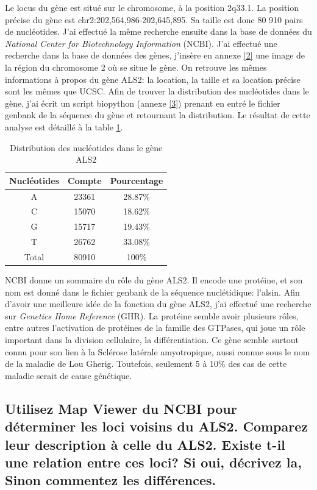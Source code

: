 \documentclass[11pt]{article} %
\begin{document}
Le locus du gène est situé sur le chromosome, à la position 2q33.1. La position précise du gène est chr2:202,564,986-202,645,895.
Sa taille est donc 80 910 pairs de nucléotides. J'ai effectué la même recherche ensuite dans la base de données du
\emph{National Center for Biotechnology Information} (NCBI). J'ai effectué une recherche dans la base de données des gènes,
j'insère en annexe \ref{2}  une image de la région du chromosome 2 où se situe le gène. On retrouve les mêmes informations
à propos du gène ALS2: la location, la taille et sa location précise sont les mêmes que UCSC. Afin de trouver la distribution
des nucléotides dans le gène, j'ai écrit un script biopython (annexe \ref{3}) prenant en entré le fichier genbank de la séquence
du gène et retournant la distribution. Le résultat de cette analyse est détaillé à la table \ref{tab:first}.
\begin{table}[b]
{\small
\centering
\begin{tabular}{|c|c|c|}

 \hline
 Nucléotides & Compte & Pourcentage \\
 \hline
 A & 23361 & 28.87\% \\
 \hline
  C & 15070 & 18.62\% \\
 \hline
  G & 15717 & 19.43\% \\
 \hline
  T & 26762 & 33.08\% \\
 \hline
  Total & 80910 & 100\% \\
 \hline
 \end{tabular}
\caption{{\small Distribution des nucléotides dans le gène ALS2}}
\label{tab:first}
}
\end{table}

NCBI donne un sommaire du rôle du gène ALS2. Il encode une protéine, et son nom est donné dans le fichier genbank de la séquence
nuclétidique: l'alsin. Afin d'avoir une meilleure idée de la fonction du gène ALS2, j'ai effectué une recherche sur 
\emph{Genetics Home Reference} (GHR). La protéine semble avoir plusieurs rôles, entre autres l'activation de 
protéines de la famille des GTPases, qui joue un rôle important dans la division cellulaire, la différentiation. Ce gène semble surtout
connu pour son lien à la Sclérose latérale amyotropique, aussi connue sous le nom de la maladie de Lou Gherig. 
Toutefois, seulement 5 à 10\% des cas de cette maladie serait de cause génétique. %

\subsection[Loci voisins du gène ALS2]{Utilisez Map Viewer du NCBI pour déterminer les loci voisins du ALS2. Comparez leur 
description à celle du ALS2. Existe t-il une relation entre ces loci? Si oui, décrivez la, Sinon commentez les différences.}
\end{document}
